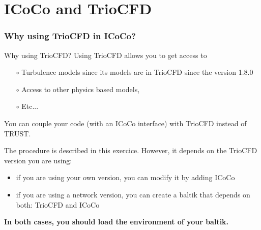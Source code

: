 \documentclass[10pt, hyperref={unicode=true,pdfusetitle, bookmarks=true,bookmarksnumbered=false,bookmarksopen=false, breaklinks=false,pdfborder={0 0 1},backref=true,colorlinks=true,linkcolor=darkblue,pageanchor, urlcolor=darkblue}]{beamer}
\begin{document}
\section{{\bf{ICoCo and TrioCFD}}}
\begin{frame}
\end{frame}
\begin{frame}
\frametitle{Why using TrioCFD in ICoCo?}
\begin{block}{Why using TrioCFD?}
Using TrioCFD allows you to get access to
    \begin{itemize}
    \item [$\circ$] Turbulence models since its models are in TrioCFD since the version 1.8.0
    \item [$\circ$] Access to other physics based models,
    \item [$\circ$] Etc...
    \end{itemize}
\end{block}

\begin{block}{}
You can couple your code (with an ICoCo interface) with TrioCFD instead of TRUST.\\
\end{block}

\begin{block}{}
The procedure is described in this exercice. However, it depends on the TrioCFD version you are using:
\begin{itemize}
\item if you are using your own version, you can modify it by adding ICoCo
\item if you are using a network version, you can create a baltik that depends on both: TrioCFD and ICoCo
\end{itemize}
\textbf{In both cases, you should load the environment of your baltik.}
\end{block}

\end{frame}
\end{document}
